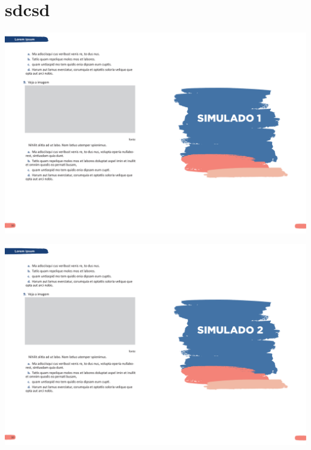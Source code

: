\chapter{sdcsd}\lipsum




\blankpage
\blankpage
{}


\blankpage
\blankpage
\blankpage
{}


\vspace*{-3.4cm}
\hspace*{-3.7cm}\includegraphics[scale=1]{../watermarks/1simulado5ano.pdf}


\vspace*{-3.4cm}
\hspace*{-3.7cm}\includegraphics[scale=1]{../watermarks/2simulado5ano.pdf}


